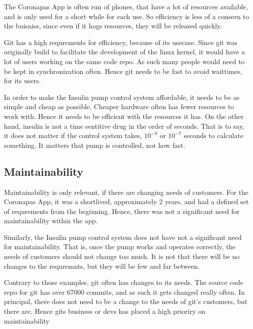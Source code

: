 The Coronapas App is often run of phones, that have a lot of resources available, and is only used for a short while for each use.
So efficiency is less of a consern to the buisniss, since even if it hogs resources, they will be released quickly.


Git has a high requrements for efficiency, because of its usecase.
Since git was originally build to facilitate the development of the linux kernel, it would have a lot of users working on the same code repo.
As such many people would need to be kept in synchronization often.
Hence git needs to be fast to avoid waittimes, for its users.

In order to make the Insulin pump control system affordable, it needs to be as simple and cheap as possible.
Cheaper hardware often has fewer resources to work with.
Hence it needs to be efficient with the resources it has.
On the other hand, insulin is not a time sentitive drug in the order of seconds.
That is to say, it does not matter if the control system takes, $10^{-9}$ or $10^{-7}$ seconds to calculate something.
It matters that pump is controlled, not how fast.



\subsection{Maintainability}
Maintainability is only relevant, if there are changing needs of customers.
For the Coronapas App, it was a shortlived, approximately 2 years, and had a defined set of requrements from the beginning.
Hence, there was not a significant need for maintainability within the app.

Similarly, the Insulin pump control system does not have not a significant need for maintainability.
That is, once the pump works and operates correctly, the needs of customers should not change too much.
It is not that there will be no changes to the requremnts, but they will be few and far between.

Contrary to those examples, git often has changes to its needs.
The source code repo for git has over 67000 commits, and as such it gets changed really often.
In principal, there does not need to be a change to the needs of git's customers, but there are.
Hence gits business or devs has placed a high prioriry on maintainability




